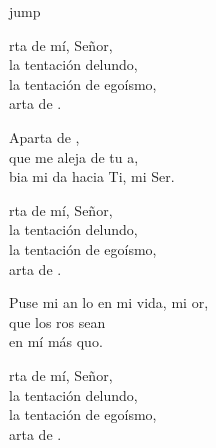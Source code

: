 \begin{cancion}jump\\
	\begin{chorus}%
		rta de mí, Señor,\\
		la tentación delundo,\\
		la tentación de egoísmo, \\
		arta de .\jump\\
	\end{chorus}%
	Aparta de ,  \\
	que me aleja de tu a,\\
	bia mi da hacia Ti, mi Ser.\jump\\
	\begin{chorus}%
		rta de mí, Señor,\\
		la tentación delundo,\\
		la tentación de egoísmo, \\
		arta de .\jump\\
	\end{chorus}%
	Puse mi an lo en mi vida, mi or,  \\
	 que los ros sean \\
	en mí más quo.\jump\\
	\begin{chorus}%
		rta de mí, Señor,\\
		la tentación delundo,\\
		la tentación de egoísmo, \\
		arta de .\jump\\
	\end{chorus}%
\end{cancion}%

